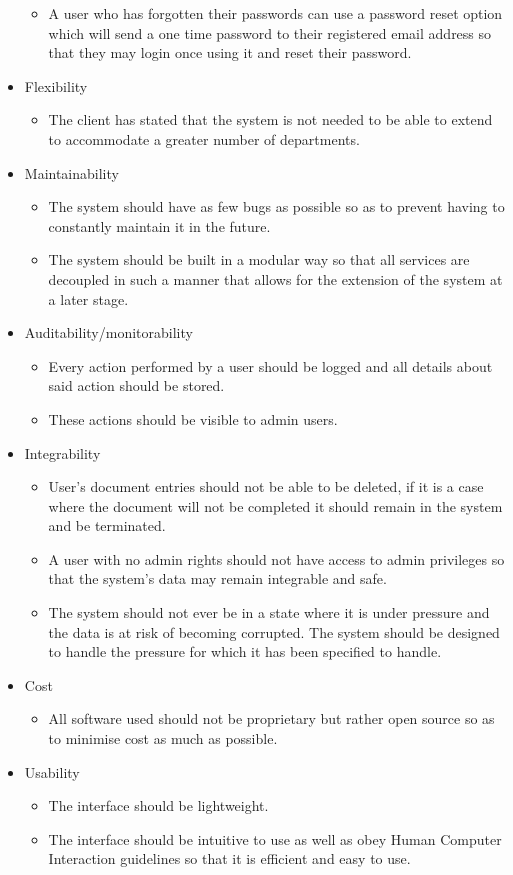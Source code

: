 \documentclass{article}
\begin{document}
\begin{itemize}
\begin{itemize}
				\item A user who has forgotten their passwords can use a password reset option which will send a one time password to their registered email address so that they may login once using it and reset their password.
			\end{itemize}
			\item Flexibility
			\begin{itemize}
				\item The client has stated that the system is not needed to be able to extend to accommodate a greater number of departments.
			\end{itemize}
			\item Maintainability
			\begin{itemize}
				\item The system should have as few bugs as possible so as to prevent having to constantly maintain it in the future.
				\item The system should be built in a modular way so that all services are decoupled in such a manner that allows for the extension of the system at a later stage.
			\end{itemize}
			\item Auditability/monitorability
			\begin{itemize}
				\item Every action performed by a user should be logged and all details about said action should be stored.
				\item These actions should be visible to admin users.
			\end{itemize}
			\item Integrability
			\begin{itemize}
				\item User's document entries should not be able to be deleted, if it is a case where the document will not be completed it should remain in the system and be terminated.
				\item A user with no admin rights should not have access to admin privileges so that the system's data may remain integrable and safe.
				\item The system should not ever be in a state where it is under pressure and the data is at risk of becoming corrupted. The system should be designed to handle the pressure for which it has been specified to handle.
			\end{itemize}
			\item Cost
			\begin{itemize}
				\item All software used should not be proprietary but rather open source so as to minimise cost as much as possible.
			\end{itemize}
			\item Usability
			\begin{itemize}
				\item The interface should be lightweight.
				\item The interface should be intuitive to use as well as obey Human Computer Interaction guidelines so that it is efficient and easy to use.
			\end{itemize}
		\end{itemize}
\end{document}
